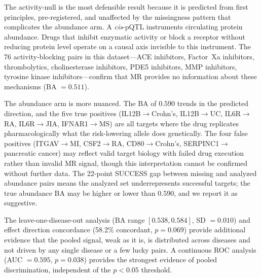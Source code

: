 \documentclass[11pt]{article}
\begin{document}
The activity-null is the most defensible result because it is predicted from first principles, pre-registered, and unaffected by the missingness pattern that complicates the abundance arm. A \emph{cis}-pQTL instruments circulating protein abundance. Drugs that inhibit enzymatic activity or block a receptor without reducing protein level operate on a causal axis invisible to this instrument. The 76 activity-blocking pairs in this dataset---ACE inhibitors, Factor~Xa inhibitors, thrombolytics, cholinesterase inhibitors, PDE5 inhibitors, MMP inhibitors, tyrosine kinase inhibitors---confirm that MR provides no information about these mechanisms (BA $= 0.511$).

The abundance arm is more nuanced. The BA of $0.590$ trends in the predicted direction, and the five true positives (IL12B$\rightarrow$Crohn's, IL12B$\rightarrow$UC, IL6R$\rightarrow$RA, IL6R$\rightarrow$JIA, IFNAR1$\rightarrow$MS) are all targets where the drug replicates pharmacologically what the risk-lowering allele does genetically. The four false positives (ITGAV$\rightarrow$MI, CSF2$\rightarrow$RA, CD80$\rightarrow$Crohn's, SERPINC1$\rightarrow$pancreatic cancer) may reflect valid target biology with failed drug execution rather than invalid MR signal, though this interpretation cannot be confirmed without further data. The 22-point SUCCESS gap between missing and analyzed abundance pairs means the analyzed set underrepresents successful targets; the true abundance BA may be higher or lower than $0.590$, and we report it as suggestive.

The leave-one-disease-out analysis (BA range $[0.538, 0.584]$, SD $= 0.010$) and effect direction concordance (58.2\% concordant, $p = 0.069$) provide additional evidence that the pooled signal, weak as it is, is distributed across diseases and not driven by any single disease or a few lucky pairs. A continuous ROC analysis (AUC $= 0.595$, $p = 0.038$) provides the strongest evidence of pooled discrimination, independent of the $p < 0.05$ threshold.
\end{document}
